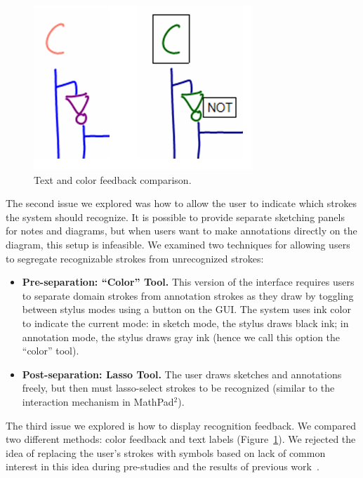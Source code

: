 \documentclass{egpubl}
\begin{document}
\begin{figure}[tb]
  \centering
  \includegraphics[width=.65\linewidth]{feedbackDemo.png}
  \caption{\label{fig:feedbackDemo}
           Text and color feedback comparison.}
\end{figure}


The second issue we explored was how to allow the user to indicate
which strokes the system should recognize.  It is possible to provide
separate sketching panels for notes and diagrams, but when users want
to make annotations directly on the diagram, this setup is infeasible.
We examined two techniques for allowing users to segregate
recognizable strokes from unrecognized strokes:

\begin{itemize}
\item \textbf{Pre-separation: ``Color'' Tool.} This version of the
  interface requires users to separate domain strokes from
  annotation strokes as they draw by toggling between stylus
  modes using a button on the GUI.  The system uses ink color to indicate the
  current mode: in sketch mode, the stylus draws black ink; in
  annotation mode, the stylus draws gray ink (hence we call this
  option the ``color'' tool).
\item \textbf{Post-separation: Lasso Tool.} The user draws sketches
  and annotations freely, but then must lasso-select strokes to be
  recognized (similar to the interaction mechanism in
  MathPad$^{2}$\cite{LaViola2006Initial}).  
\end{itemize}

The third issue we explored is how to display recognition feedback.
We compared two different methods: color feedback and text labels
(Figure~\ref{fig:feedbackDemo}).  We rejected the idea of replacing
the user's strokes with symbols based on lack of common interest in
this idea during pre-studies and the results of previous
work~\cite{Hong2002Sketch}.
\end{document}
